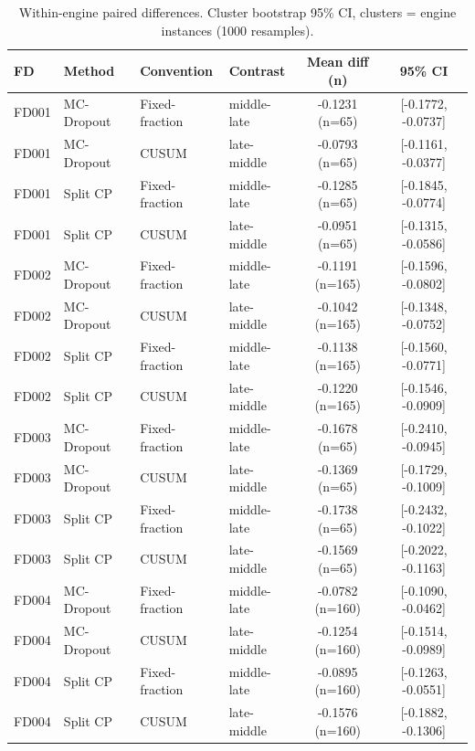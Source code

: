 \begin{table}[t]
\caption{Within-engine paired differences. Cluster bootstrap 95\% CI, clusters = engine instances (1000 resamples).}
\label{tab:paired-diff-final}
\centering
\small
\begin{tabular}{llllcc}
\toprule
FD & Method & Convention & Contrast & Mean diff (n) & 95\% CI \\
\midrule
FD001 & MC-Dropout & Fixed-fraction & middle-late & -0.1231 (n=65) & [-0.1772, -0.0737] \\
FD001 & MC-Dropout & CUSUM & late-middle & -0.0793 (n=65) & [-0.1161, -0.0377] \\
FD001 & Split CP & Fixed-fraction & middle-late & -0.1285 (n=65) & [-0.1845, -0.0774] \\
FD001 & Split CP & CUSUM & late-middle & -0.0951 (n=65) & [-0.1315, -0.0586] \\
FD002 & MC-Dropout & Fixed-fraction & middle-late & -0.1191 (n=165) & [-0.1596, -0.0802] \\
FD002 & MC-Dropout & CUSUM & late-middle & -0.1042 (n=165) & [-0.1348, -0.0752] \\
FD002 & Split CP & Fixed-fraction & middle-late & -0.1138 (n=165) & [-0.1560, -0.0771] \\
FD002 & Split CP & CUSUM & late-middle & -0.1220 (n=165) & [-0.1546, -0.0909] \\
FD003 & MC-Dropout & Fixed-fraction & middle-late & -0.1678 (n=65) & [-0.2410, -0.0945] \\
FD003 & MC-Dropout & CUSUM & late-middle & -0.1369 (n=65) & [-0.1729, -0.1009] \\
FD003 & Split CP & Fixed-fraction & middle-late & -0.1738 (n=65) & [-0.2432, -0.1022] \\
FD003 & Split CP & CUSUM & late-middle & -0.1569 (n=65) & [-0.2022, -0.1163] \\
FD004 & MC-Dropout & Fixed-fraction & middle-late & -0.0782 (n=160) & [-0.1090, -0.0462] \\
FD004 & MC-Dropout & CUSUM & late-middle & -0.1254 (n=160) & [-0.1514, -0.0989] \\
FD004 & Split CP & Fixed-fraction & middle-late & -0.0895 (n=160) & [-0.1263, -0.0551] \\
FD004 & Split CP & CUSUM & late-middle & -0.1576 (n=160) & [-0.1882, -0.1306] \\
\bottomrule
\end{tabular}
\end{table}

